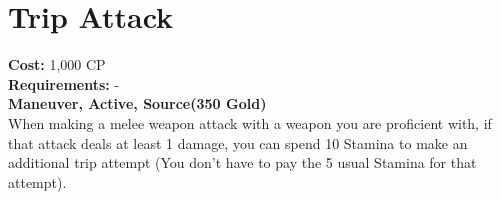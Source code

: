 \section{Trip Attack}
\textbf{Cost:} 1,000 CP\\
\textbf{Requirements:} -\\
\textbf{Maneuver, Active, Source(350 Gold)}\\
When making a melee weapon attack with a weapon you are proficient with, if that attack deals at least 1 damage, you can spend 10 Stamina to make an additional trip attempt (You don't have to pay the 5 usual Stamina for that attempt).\\
